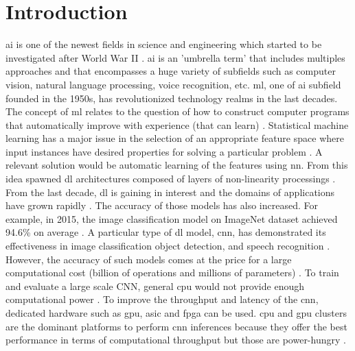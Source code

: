 \chapter{Introduction} \label{chap:intr}
%
\acrfull{ai} is one of the newest fields in science and engineering which started to be investigated  after World War II \cite{russell_artificial_2009}. \acrshort{ai} is an 'umbrella term' that includes multiples approaches and that encompasses a huge variety of subfields such as computer vision, natural language processing, voice recognition, etc.
\acrfull{ml}, one of \acrshort{ai} subfield founded in the 1950s, has revolutionized technology realms in the last decades. The concept of \acrshort{ml} relates to the question of how to construct computer programs that automatically improve with experience (that can learn) \cite{mitchell_machine_1997}. \newline \newline
%
Statistical machine learning has a major issue in the selection of an appropriate feature space where input instances have desired properties for solving a particular problem \cite{arnold_introduction_2011}. A relevant solution would be automatic learning of the features using \acrfull{nn}. From this idea spawned \acrfull{dl} architectures composed of layers of non-linearity processings \cite{alom_history_2018}. From the last decade, \acrshort{dl} is gaining in interest and the domains of applications have grown rapidly \cite{wason_deep_2018}. The accuracy of those models has also increased. For example, in 2015, the image classification model on ImageNet dataset achieved 94.6\% on average \cite{russakovsky_imagenet_2015}.\newline \newline
%
A particular type of \acrshort{dl} model, \acrfull{cnn}, has demonstrated its effectiveness in image classiﬁcation object detection, and speech recognition \cite{shawahna_fpga-based_2019}. However, the accuracy of such models comes at the price for a large computational cost (billion of operations and millions of parameters) \cite{szegedy_going_2014}. To train and evaluate a large scale CNN, general \acrfull{cpu} would not provide enough computational power \cite{liu_fpga-based_2019}. To improve the throughput and latency of the \acrshort{cnn}, dedicated hardware such as \acrfull{gpu}, \acrfull{asic} and \acrfull{fpga} can be used. \acrshort{cpu} and \acrshort{gpu} clusters are the dominant platforms to perform \acrshort{cnn} inferences because they offer the best performance in terms of computational throughput but those are power-hungry \cite{liu_uniform_2019}.
